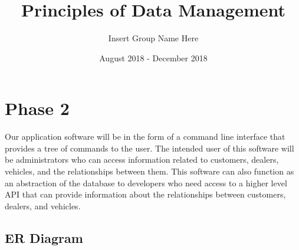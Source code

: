 \documentclass{math}
\title{Principles of Data Management}
\author{Insert Group Name Here}
\date{August 2018 - December 2018}
\begin{document}
\lstset{basicstyle=\ttfamily\footnotesize,breaklines=true}
\maketitle

\section*{Phase 2}
Our application software will be in the form of a command line interface that
provides a tree of commands to the user. The intended user of this software will
be administrators who can access information related to customers, dealers,
vehicles, and the relationships between them. This software can also function
as an abstraction of the database to developers who need access to a higher
level API that can provide information about the relationships between
customers, dealers, and vehicles.

\subsection*{ER Diagram}
\end{document}
